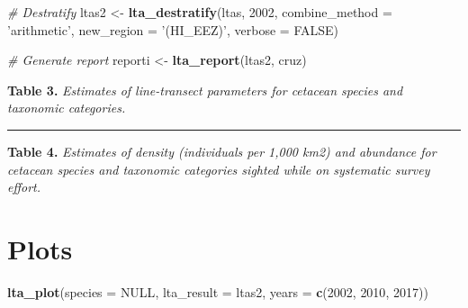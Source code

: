 \documentclass[
]{book}
\newenvironment{Shaded}{\begin{snugshade}}{\end{snugshade}}
\newcommand{\CommentTok}[1]{\textcolor[rgb]{0.56,0.35,0.01}{\textit{#1}}}
\newcommand{\DataTypeTok}[1]{\textcolor[rgb]{0.13,0.29,0.53}{#1}}
\newcommand{\DecValTok}[1]{\textcolor[rgb]{0.00,0.00,0.81}{#1}}
\newcommand{\KeywordTok}[1]{\textcolor[rgb]{0.13,0.29,0.53}{\textbf{#1}}}
\newcommand{\NormalTok}[1]{#1}
\newcommand{\OperatorTok}[1]{\textcolor[rgb]{0.81,0.36,0.00}{\textbf{#1}}}
\newcommand{\OtherTok}[1]{\textcolor[rgb]{0.56,0.35,0.01}{#1}}
\newcommand{\StringTok}[1]{\textcolor[rgb]{0.31,0.60,0.02}{#1}}
\begin{document}
\begin{Shaded}
\begin{Highlighting}[]
\CommentTok{# Destratify}
\NormalTok{ltas2 <-}\StringTok{ }\KeywordTok{lta_destratify}\NormalTok{(ltas, }\DecValTok{2002}\NormalTok{,}
                        \DataTypeTok{combine_method =} \StringTok{'arithmetic'}\NormalTok{,}
                        \DataTypeTok{new_region =} \StringTok{'(HI_EEZ)'}\NormalTok{,}
                        \DataTypeTok{verbose =} \OtherTok{FALSE}\NormalTok{)}

\CommentTok{# Generate report}
\NormalTok{reporti <-}\StringTok{ }\KeywordTok{lta_report}\NormalTok{(ltas2, cruz)}
\end{Highlighting}
\end{Shaded}

\textbf{Table 3.} \emph{Estimates of line-transect parameters for cetacean species and taxonomic categories.}

\begin{Shaded}
\end{Shaded}

\begin{center}\rule{0.5\linewidth}{0.5pt}\end{center}

\textbf{Table 4.} \emph{Estimates of density (individuals per 1,000 km2) and abundance for cetacean species and taxonomic categories sighted while on systematic survey effort.}

\begin{Shaded}
\end{Shaded}

\hypertarget{plots-2}{%
\section*{Plots}\label{plots-2}}

\begin{Shaded}
\begin{Highlighting}[]
\KeywordTok{lta_plot}\NormalTok{(}\DataTypeTok{species =} \OtherTok{NULL}\NormalTok{, }
         \DataTypeTok{lta_result =}\NormalTok{ ltas2, }
         \DataTypeTok{years =} \KeywordTok{c}\NormalTok{(}\DecValTok{2002}\NormalTok{, }\DecValTok{2010}\NormalTok{, }\DecValTok{2017}\NormalTok{))}
\end{Highlighting}
\end{Shaded}
\end{document}
